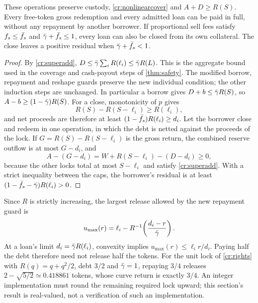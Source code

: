 \begin{proposition}\label{cr:nonlinearsafety}
These operations preserve custody, \eqref{cr:nonlinearcover} and $A+D\ge R(S)$. Every free-token gross redemption and every admitted loan can be paid in full, without any repayment by another borrower. If proportional sell fees satisfy $f_s\le\bar f_s$ and $\bar\gamma+\bar f_s\le1$, every loan can also be closed from its own collateral. The close leaves a positive residual when $\bar\gamma+\bar f_s<1$.
\end{proposition}
\begin{proof}
By \eqref{cr:superadd}, $D\le\bar\gamma\sum_iR(\ell_i)\le\bar\gamma R(L)$. This is the aggregate bound used in the coverage and cash-payout steps of \cref{thm:safety}. The modified borrow, repayment and reshape guards preserve the new individual condition; the other induction steps are unchanged. In particular a borrow gives $D+b\le\bar\gamma R(S)$, so $A-b\ge(1-\bar\gamma)R(S)$. For a close, monotonicity of $p$ gives
\[
R(S)-R(S-\ell_i)\ge R(\ell_i),
\]
and net proceeds are therefore at least $(1-\bar f_s)R(\ell_i)\ge d_i$. Let the borrower close and redeem in one operation, in which the debt is netted against the proceeds of the lock. If $G=R(S)-R(S-\ell_i)$ is the gross return, the combined reserve outflow is at most $G-d_i$, and
\[
A-(G-d_i)=W+R(S-\ell_i)-(D-d_i)\ge0,
\]
because the other locks total at most $S-\ell_i$ and satisfy \eqref{cr:superadd}. With a strict inequality between the caps, the borrower's residual is at least $(1-\bar f_s-\bar\gamma)R(\ell_i)>0$.
\end{proof}

Since $R$ is strictly increasing, the largest release allowed by the new repayment guard is
\begin{equation}\label{cr:maxrelease}
u_{\max}(r)=\ell_i-R^{-1}\!\left(\frac{d_i-r}{\bar\gamma}\right).
\end{equation}
At a loan's limit $d_i=\bar\gamma R(\ell_i)$, convexity implies $u_{\max}(r)\le\ell_i r/d_i$. Paying half the debt therefore need not release half the tokens. For the unit lock of \cref{cr:rights} with $R(q)=q+q^2/2$, debt $3/2$ and $\bar\gamma=1$, repaying $3/4$ releases $2-\sqrt{5/2}\simeq0.418861$ tokens, whose curve return is exactly $3/4$. An integer implementation must round the remaining required lock upward; this section's result is real-valued, not a verification of such an implementation.

